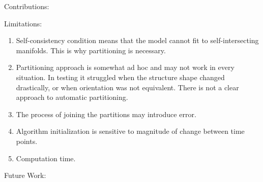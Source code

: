 \documentclass[11pt,reqno]{article}
\begin{document}
Contributions:

Limitations:
\begin{enumerate}
  \item Self-consistency condition means that the model cannot fit to self-intersecting manifolds. This is why partitioning is necessary.
  \item Partitioning approach is somewhat ad hoc and may not work in every situation. In testing it struggled when the structure shape changed drastically, or when orientation was not equivalent. There is not a clear approach to automatic partitioning.
  \item The process of joining the partitions may introduce error.
  \item Algorithm initialization is sensitive to magnitude of change between time points.
  \item Computation time.
\end{enumerate}

Future Work:

\LinesNumbered

\end{document}
